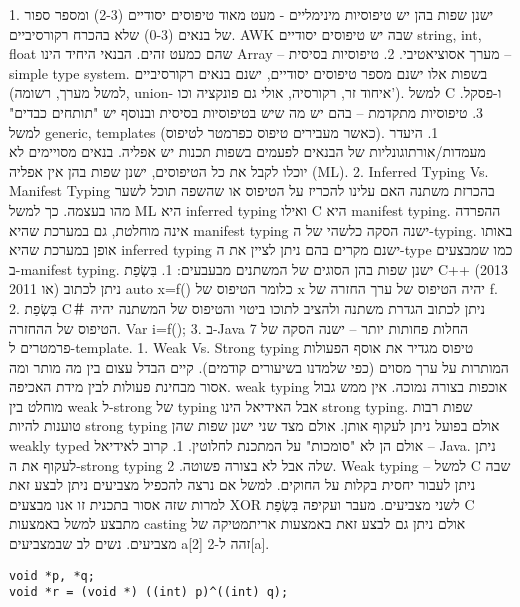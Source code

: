      1. ישנן שפות בהן יש טיפוסיות מינימליים - מעט מאוד טיפוסים יסודיים (2-3) ומספר ספור של בנאים (0-3) שלא בהכרח רקורסיביים.
      AWK שבה יש טיפוסים יסודיים string, int, float שהם כמעט זהים.
      הבנאי היחיד הינו Array – מערך אסוציאטיבי.
      2. טיפוסיות בסיסית – simple type system. בשפות אלו ישנם מספר טיפוסים יסודיים, ישנם בנאים רקורסיביים (למשל מערך, רשומה, union- איחוד זר, רקורסיה, אולי גם פונקציה וכו'). למשל C ו-פסקל.
      3. טיפוסיות מתקדמת – בהם יש מה שיש בטיפוסיות בסיסית ובנוסף יש "תותחים כבדים" למשל generic, templates (כאשר מעבירים טיפוס כפרמטר לטיפוס).
      1. היעדר מעמדות/אורתוגונליות של הבנאים לפעמים בשפות תכנות יש אפליה. בנאים מסויימים לא יוכלו לקבל את כל הטיפוסים, ישנן שפות בהן אין אפליה (ML).
      2. Inferred Typing Vs. Manifest Typing בהכרזת משתנה האם עלינו להכריז על הטיפוס או שהשפה תוכל לשער מהו בעצמה. כך למשל ML היא inferred typing ואילו C היא manifest typing. ההפרדה אינה מוחלטת, גם במערכת שהיא manifest typing ישנה הסקה כלשהי של ה-typing. באותו אופן במערכת שהיא inferred typing ישנם מקרים בהם ניתן לציין את ה-type כמו שמבצעים ב-manifest typing.
      ישנן שפות בהן הסוגים של המשתנים מבעבעים:
      1. בִּשְׂפַת C++ (2013 או 2011) ניתן לכתוב auto x=f() כלומר הטיפוס של x יהיה הטיפוס של ערך החזרה של f.
      2. בִּשְׂפַת C＃ ניתן לכתוב הגדרת משתנה ולהציב לתוכו ביטוי והטיפוס של המשתנה יהיה הטיפוס של ההחזרה. Var i=f();
      3. ב-Java 7 החלות פחותות יותר – ישנה הסקה של פרמטרים ל-template.
      1. Weak Vs. Strong typing טיפוס מגדיר את אוסף הפעולות המותרות על ערך מסוים (כפי שלמדנו בשיעורים קודמים). קיים הבדל עצום בין מה מותר ומה אסור מבחינת פעולות לבין מידת האכיפה.
      weak typing אוכפות בצורה נמוכה. אין ממש גבול מוחלט בין weak ל-strong של typing אבל האידיאל הינו strong typing.
      שפות רבות טוענות להיות strong typing אולם בפועל ניתן לעקוף אותן. אולם מצד שני ישנן שפות שהן weakly typed אולם הן לא "סומכות" על המתכנת לחלוטין.
      1. קרוב לאידיאל – Java. ניתן לעקוף את ה-strong typing שלה אבל לא בצורה פשוטה.
      2. Weak typing – למשל C שבה ניתן לעבור יחסית בקלות על החוקים. למשל אם נרצה להכפיל מצביעים ניתן לבצע זאת למרות שזה אסור
      בתכנית זו אנו מבצעים XOR לשני מצביעים.
      מעבר ועקיפה בִּשְׂפַת C מתבצע למשל באמצעות casting אולם ניתן גם לבצע זאת באמצעות אריתמטיקה של מצביעים. נשים לב שבמצביעים a[2] זהה ל-2[a].

\begin{verbatim}
void *p, *q;
void *r = (void *) ((int) p)^((int) q);
\end{verbatim}

